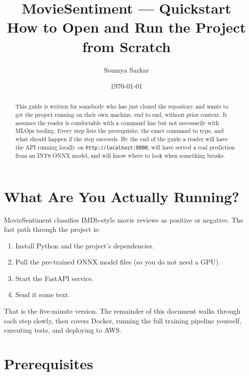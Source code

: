 \documentclass[11pt,a4paper]{article}
\title{\textbf{MovieSentiment --- Quickstart}\\[2pt]
       \large How to Open and Run the Project from Scratch}
\author{Soumya Sarkar}
\date{\today}
\begin{document}
\maketitle

\begin{abstract}
\noindent This guide is written for somebody who has just cloned the repository and
wants to get the project running on their own machine, end to end, without prior
context. It assumes the reader is comfortable with a command line but not
necessarily with MLOps tooling. Every step lists the prerequisite, the exact
command to type, and what should happen if the step succeeds. By the end of the
guide a reader will have the API running locally on
\texttt{http://localhost:8000}, will have served a real prediction from an INT8
ONNX model, and will know where to look when something breaks.
\end{abstract}

\tableofcontents
\newpage

\section{What Are You Actually Running?}

MovieSentiment classifies IMDb-style movie reviews as positive or negative. The
fast path through the project is:

\begin{enumerate}[leftmargin=*]
\item Install Python and the project's dependencies.
\item Pull the pre-trained ONNX model files (so you do not need a GPU).
\item Start the FastAPI service.
\item Send it some text.
\end{enumerate}

\noindent That is the five-minute version. The remainder of this document walks
through each step slowly, then covers Docker, running the full training pipeline
yourself, executing tests, and deploying to AWS.

\section{Prerequisites}
\end{document}
